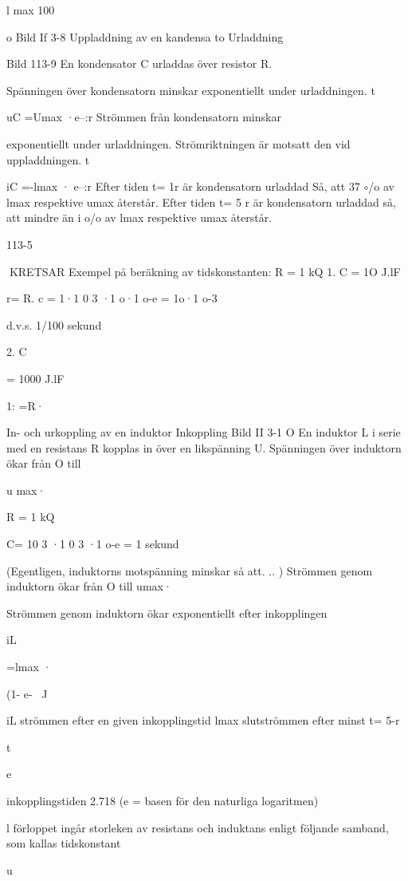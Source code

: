 \documentclass[a4paper,twoside,twocolumn,openright]{book}
\begin{document}
{{{{l max
100%

o
Bild If 3-8 Uppladdning av en kandensa to
Urladdning

Bild 113-9
En kondensator C urladdas över resistor R.

Spänningen över kondensatorn minskar
exponentiellt under urladdningen.
t

uC =Umax ·e--:r
Strömmen från kondensatorn minskar

exponentiellt under urladdningen. Strömriktningen är motsatt den vid uppladdningen.
t

iC =-lmax · e--:r
Efter tiden t= 1r är kondensatorn urladdad Så, att 37 $\circ$/o av lmax respektive umax
återstår.
Efter tiden t= 5 r är kondensatorn urladdad så, att mindre än i o/o av lmax respektive
umax återstår.

113-5

KRETSAR
Exempel på beräkning av tidskonstanten:
R = 1 kQ
1. C = 1O J.lF

r= R. c = 1·1 0 3 ·1 o·1 o-e = 1o·1 o-3

d.v.s. 1/100 sekund

2. C

= 1000 J.lF

1: =R·

In- och urkoppling av en induktor
Inkoppling
Bild II 3-1 O
En induktor L i serie med en resistans R
kopplas in över en likspänning U.
Spänningen över induktorn ökar från O till

u max·

R = 1 kQ

C= 10 3 ·1 0 3 ·1 o-e = 1 sekund

(Egentligen, induktorns motspänning
minskar så att. .. )
Strömmen genom induktorn ökar från O
till umax·

Strömmen genom induktorn ökar exponentiellt efter inkopplingen

iL

=lmax ·

(1- e-~ J

iL strömmen efter en given inkopplingstid
lmax slutströmmen efter minst t= 5-r

t

e

inkopplingstiden
2.718 (e = basen för den naturliga
logaritmen)

l förloppet ingår storleken av resistans
och induktans enligt följande samband, som
kallas tidskonstant

u

}}}}
\end{document}
